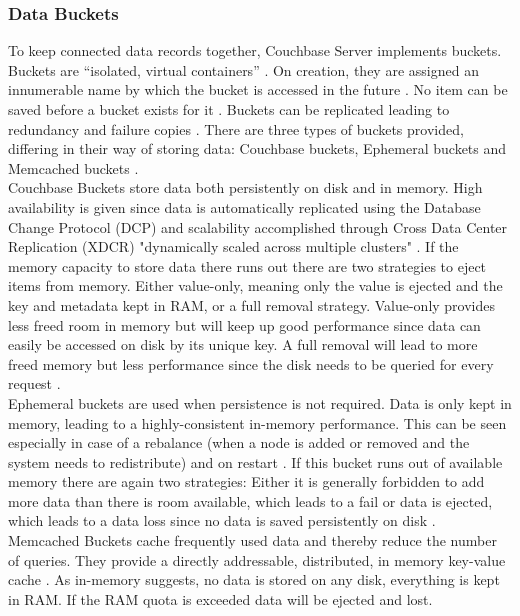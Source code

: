 \subsubsection{Data Buckets}
To keep connected data records together, Couchbase Server implements buckets. Buckets are “isolated, virtual containers” \parencite{objelean}. On creation, they are assigned an innumerable name by which the bucket is accessed in the future \parencite{couchbaseDocuBuckMemStor}. No item can be saved before a bucket exists for it \parencite{couchbaseDocuMemory}. Buckets can be replicated leading to redundancy and failure copies \parencite{couchbaseWeb}. There are three types of buckets provided, differing in their way of storing data: Couchbase buckets, Ephemeral buckets and Memcached buckets \parencite{couchbaseDocuMemory}.\\ 
Couchbase Buckets store data both persistently on disk and in memory. High availability is given since data is automatically replicated using the Database Change Protocol (DCP) and scalability accomplished through Cross Data Center Replication (XDCR) "dynamically scaled across multiple clusters" \parencite{couchbaseDocuBuckets}. If the memory capacity to store data there runs out there are two strategies to eject items from memory. Either value-only, meaning only the value is ejected and the key and metadata kept in RAM, or a full removal strategy. Value-only provides less freed room in memory but will keep up good performance since data can easily be accessed on disk by its unique key. A full removal will lead to more freed memory but less performance since the disk needs to be queried for every request \parencite{couchbaseDocuBuckets}.\\
Ephemeral buckets are used when persistence is not required. Data is only kept in memory, leading to a highly-consistent in-memory performance. This can be seen especially in case of a rebalance (when a node is added or removed and the system needs to redistribute) and on restart \parencite{couchbaseDocuBuckets}. If this bucket runs out of available memory there are again two strategies: Either it is generally forbidden to add more data than there is room available, which leads to a fail or data is ejected, which leads to a data loss since no data is saved persistently on disk \parencite{couchbaseDocuBuckets}. \\
Memcached Buckets cache frequently used data and thereby reduce the number of queries. They provide a directly addressable, distributed, in memory key-value cache \parencite{couchbaseDocuBuckets}. As in-memory suggests, no data is stored on any disk, everything is kept in RAM. If the RAM quota is exceeded data will be ejected and lost.\\

